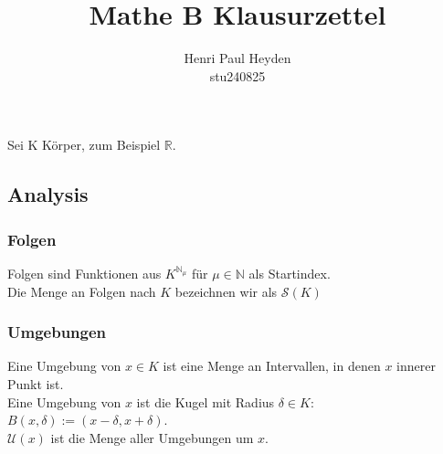 \documentclass{article}
\title{Mathe B Klausurzettel}
\author{Henri Paul Heyden \\ \small{stu240825}}
\date{}
\begin{document}
\maketitle
Sei K Körper, zum Beispiel \(\mathbb R\).
\subsection*{Analysis}
\subsubsection*{Folgen}
Folgen sind Funktionen aus \(K ^ {\mathbb{N}_\mu}\) für \(\mu \in \mathbb{N}\) als Startindex. \\
Die Menge an Folgen nach \(K\) bezeichnen wir als \(\mathcal{S}(K)\)
\subsubsection*{Umgebungen}
Eine Umgebung von \(x\in K\) ist eine Menge an Intervallen, in denen \(x\) innerer Punkt ist. \\
Eine Umgebung von \(x\) ist die Kugel mit Radius \(\delta \in K\): \(B(x, \delta) := (x-\delta, x+\delta)\). \\
\(\mathcal{U}(x)\) ist die Menge aller Umgebungen um \(x\).
\end{document}
